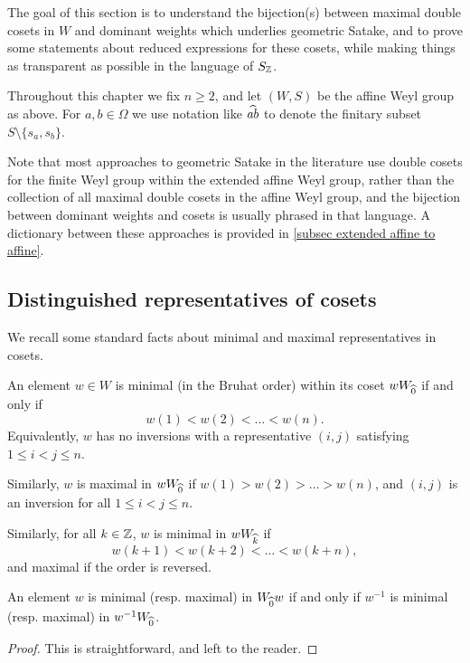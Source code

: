 The goal of this section is to understand the bijection(s) between maximal double cosets in $W$ and dominant weights which underlies geometric Satake, and to prove some statements about reduced expressions for these cosets, while making things as transparent as possible in the language of $S_{\mathbb{Z}}$.

Throughout this chapter we fix $n \ge 2$, and let $(W,S)$ be the affine Weyl group as above. For $a,b \in \Omega$ we use notation like $\widehat{ab}$ to denote the finitary subset $S \setminus \{s_a, s_b\}$.

\begin{remark} Note that most approaches to geometric Satake in the literature use double cosets for the finite Weyl group within the extended affine Weyl group, rather than the collection of all maximal double cosets in the affine Weyl group, and the bijection between dominant weights and cosets is usually phrased in that language. A dictionary between these approaches is provided in \cref{subsec extended affine to affine}. \end{remark}


\subsection{Distinguished representatives of cosets}

We recall some standard facts about minimal and maximal representatives in cosets.

\begin{lemma} An element $w \in W$ is minimal (in the Bruhat order) within its coset $w W_{\widehat{0}}$ if and only if
\begin{equation} w(1) < w(2) < \ldots < w(n).\end{equation}
Equivalently, $w$ has no inversions with a representative $(i,j)$ satisfying $1 \le i < j \le n$.

Similarly, $w$ is maximal in $w W_{\widehat{0}}$ if $w(1) > w(2) > \ldots > w(n)$, and $(i,j)$ is an inversion for all $1 \le i < j \le n$.

Similarly, for all $k \in \mathbb{Z}$, $w$ is minimal in $w W_{\widehat{k}}$ if
\[ w(k+1) < w(k+2) < \ldots < w(k+n), \]
and maximal if the order is reversed.

An element $w$ is minimal (resp. maximal) in $W_{\widehat{0}} w$ if and only if $w^{-1}$ is minimal (resp. maximal) in $w^{-1} W_{\widehat{0}}$. \end{lemma}

\begin{proof} This is straightforward, and left to the reader. \end{proof}

